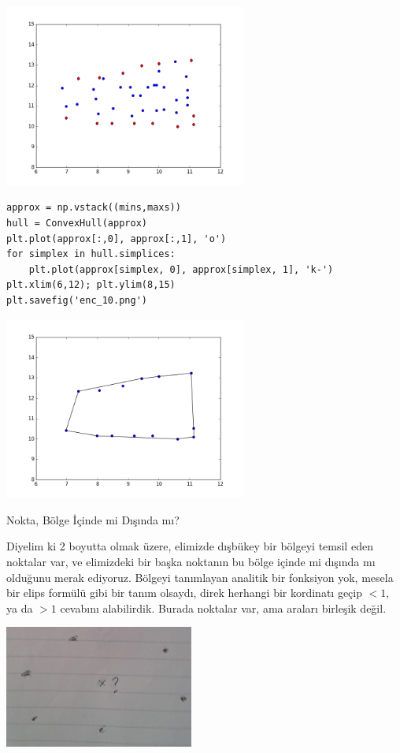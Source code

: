 \documentclass[12pt,fleqn]{article}\usepackage{../../common}
\begin{document}
\includegraphics[height=6cm]{enc_02.png}

\begin{verbatim}
approx = np.vstack((mins,maxs))
hull = ConvexHull(approx)
plt.plot(approx[:,0], approx[:,1], 'o')
for simplex in hull.simplices:
    plt.plot(approx[simplex, 0], approx[simplex, 1], 'k-')
plt.xlim(6,12); plt.ylim(8,15)
plt.savefig('enc_10.png')
\end{verbatim}

\includegraphics[height=6cm]{enc_10.png}

Nokta, Bölge İçinde mi Dışında mı?

Diyelim ki 2 boyutta olmak üzere, elimizde dışbükey bir bölgeyi temsil eden
noktalar var, ve elimizdeki bir başka noktanın bu bölge içinde mi dışında
mı olduğunu merak ediyoruz. Bölgeyi tanımlayan analitik bir fonksiyon yok,
mesela bir elips formülü gibi bir tanım olsaydı, direk herhangi bir
kordinatı geçip $<1$, ya da $>1$ cevabını alabilirdik. Burada noktalar var,
ama araları birleşik değil.

\includegraphics[height=4cm]{enc_05.png}
\end{document}
